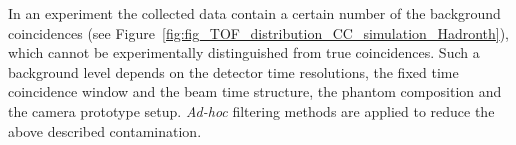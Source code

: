 In an experiment the collected data contain a certain number of the background coincidences (see Figure~\ref{fig:fig_TOF_distribution_CC_simulation_Hadronth}), which cannot be experimentally distinguished from true coincidences. Such a background level depends on the detector time resolutions, the fixed time coincidence window and the beam time structure, the phantom composition and the camera prototype setup.
\textit{Ad-hoc} filtering methods are applied to reduce the above described contamination.

